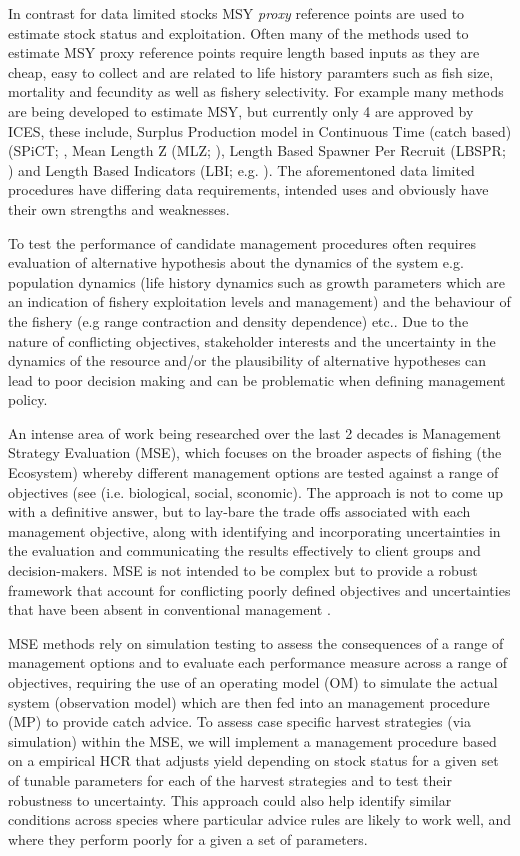 \documentclass[preprint,12pt]{elsarticle}
\begin{document}
In contrast for data limited stocks MSY \emph{proxy} reference points are used to estimate stock status and exploitation.  Often many of the methods used to estimate MSY proxy reference points require length based inputs as they are cheap, easy to collect \cite{quinn1999quantitative} and are related to life history paramters such as fish size, mortality and fecundity as well as fishery selectivity. For example many methods are being developed to estimate MSY, but currently only 4 are approved by ICES, these include, Surplus Production model in Continuous Time (catch based) (SPiCT; \cite{pedersen2017stochastic}, Mean Length Z (MLZ; \cite{gedamke2006estimating}), Length Based Spawner Per Recruit (LBSPR; \cite{hordyk2014some}) and Length Based Indicators (LBI; e.g. \cite{probst2013indicator}). The aforementoned data limited procedures have differing data requirements, intended uses and obviously have their own strengths and weaknesses. 

To test the performance of candidate management procedures often requires evaluation of alternative hypothesis about the dynamics of the system e.g. population dynamics (life history dynamics such as growth parameters which are an indication of fishery exploitation levels and management) and the behaviour of the fishery (e.g range contraction and density dependence) etc.. Due to the nature of conflicting objectives, stakeholder interests and the uncertainty in the dynamics of the resource and/or the plausibility of alternative hypotheses can lead to poor decision making and can be problematic when defining management policy.

An intense area of work being researched over the last 2 decades is Management Strategy Evaluation (MSE), which focuses on the broader aspects of fishing (the Ecosystem) whereby different management options are tested against a range of objectives (see \cite{kell2007flr} (i.e. biological, social, sconomic). The approach is not to come up with a definitive answer, but to lay-bare the trade offs associated with each management objective, along with identifying and incorporating uncertainties in the evaluation and communicating the results effectively to client groups and decision-makers. MSE is not intended to be complex but to provide a robust framework that account for conflicting poorly defined objectives and uncertainties that have been absent in conventional management \cite{kell2007flr}. 

MSE methods rely on simulation testing to assess the consequences of a range of management options and to evaluate each performance measure across a range of objectives, requiring the use of an operating model (OM) to simulate the actual system (observation model) which are then fed into an management procedure (MP) to provide catch advice. To assess case specific harvest strategies (via simulation) within the MSE, we will implement a management procedure based on a empirical HCR that adjusts yield depending on stock status for a given set of tunable parameters for each of the harvest strategies and to test their robustness to uncertainty.  This approach could also help identify similar conditions across species where particular advice rules are likely to work well, and where they perform poorly for a given a set of parameters. 
\end{document}
